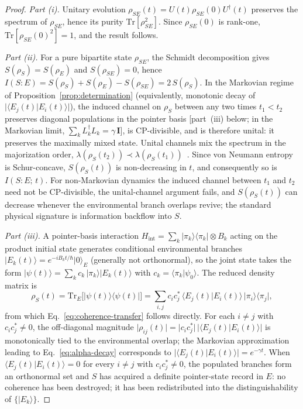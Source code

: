 \begin{proof}
\emph{Part (i).}
Unitary evolution $\rho_{SE}(t) = U(t)\rho_{SE}(0)U^\dagger(t)$
preserves the spectrum of $\rho_{SE}$, hence its purity
$\mathrm{Tr}[\rho_{SE}^2]$.
Since $\rho_{SE}(0)$ is rank-one, $\mathrm{Tr}[\rho_{SE}(0)^2] = 1$,
and the result follows.

\emph{Part (ii).}
For a pure bipartite state $\rho_{SE}$, the Schmidt decomposition
gives $S(\rho_S) = S(\rho_E)$ and $S(\rho_{SE}) = 0$, hence
$I(S\!:\!E) = S(\rho_S) + S(\rho_E) - S(\rho_{SE}) = 2\,S(\rho_S)$.
In the Markovian regime of
Proposition~\ref{prop:determination} (equivalently, monotonic decay of $\lvert\langle E_j(t)\vert E_i(t)\rangle\rvert$), the induced channel on $\rho_S$ between any two times $t_1 < t_2$ preserves
diagonal populations in the pointer basis [part~(iii) below; in the
Markovian limit, $\sum_k L_k^\dagger L_k = \gamma\,\mathbf{I}$], is
CP-divisible, and is therefore unital: it preserves the maximally
mixed state.
Unital channels mix the spectrum in the majorization order,
$\lambda(\rho_S(t_2)) \prec \lambda(\rho_S(t_1))$~\cite{NielsenChuang2000}.
Since von Neumann entropy is Schur-concave, $S(\rho_S(t))$ is
non-decreasing in $t$, and consequently so is $I(S\!:\!E;\,t)$.
For non-Markovian dynamics the induced channel between $t_1$ and $t_2$
need not be CP-divisible, the unital-channel argument fails, and
$S(\rho_S(t))$ can decrease whenever the environmental branch overlaps
revive; the standard physical signature is information backflow into
$S$.

\emph{Part (iii).}
A pointer-basis interaction
$H_{\mathrm{int}} = \sum_k\vert\pi_k\rangle\langle\pi_k\vert\otimes B_k$
acting on the product initial state generates conditional environmental
branches $\vert E_k(t)\rangle = e^{-iB_k t/\hbar}\vert 0\rangle_E$
(generally not orthonormal), so the joint state takes the form
$\vert\psi(t)\rangle = \sum_k c_k\,\vert\pi_k\rangle\vert E_k(t)\rangle$
with $c_k = \langle\pi_k\vert\psi_0\rangle$.
The reduced density matrix is
\begin{equation*}
  \rho_S(t) = \mathrm{Tr}_E\!\bigl[\vert\psi(t)\rangle\langle\psi(t)\vert\bigr]
  = \sum_{i,j} c_i c_j^*\,\langle E_j(t)\vert E_i(t)\rangle\,
    \vert\pi_i\rangle\langle\pi_j\vert,
\end{equation*}
from which Eq.~\eqref{eq:coherence-transfer} follows directly.
For each $i\neq j$ with $c_i c_j^* \neq 0$, the off-diagonal magnitude
$\lvert\rho_{ij}(t)\rvert = \lvert c_i c_j^*\rvert\,
\lvert\langle E_j(t)\vert E_i(t)\rangle\rvert$ is monotonically tied to
the environmental overlap; the Markovian approximation leading to
Eq.~\eqref{eq:alpha-decay} corresponds to
$\lvert\langle E_j(t)\vert E_i(t)\rangle\rvert = e^{-\gamma t}$.
When $\langle E_j(t)\vert E_i(t)\rangle = 0$ for every $i\neq j$ with
$c_i c_j^* \neq 0$, the populated branches form an orthonormal set and
$S$ has acquired a definite pointer-state record in $E$: no coherence has been destroyed; it has been redistributed into the
distinguishability of $\{\vert E_k\rangle\}$.
\end{proof}

